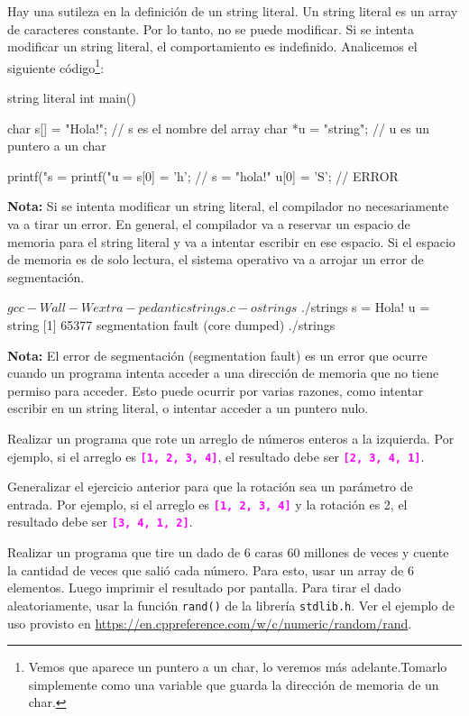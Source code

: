 \documentclass[]{scrartcl}
\newcommand{\hl}[1]{\textcolor{magenta}{\textbf{\texttt{#1}}}}
\begin{document}
Hay una sutileza en la definición de un string literal. Un string literal es un array de caracteres constante. Por lo tanto, no se puede modificar. Si se intenta modificar un string literal, el comportamiento es indefinido. Analicemos el siguiente código\footnote{Vemos que aparece un puntero a un char, lo veremos más adelante.Tomarlo simplemente como una variable que guarda la dirección de memoria de un char.}:

\begin{cbox}[]{string literal}
  int main(){
    char s[] = "Hola!"; // s es el nombre del array
    char *u = "string"; // u es un puntero a un char
    
    printf("s = %
    printf("u = %
    s[0] = 'h'; // s = "hola!"
    u[0] = 'S'; // ERROR
  }
\end{cbox}

\begin{notebox}
  \textbf{Nota:} Si se intenta modificar un string literal, el compilador no necesariamente va a tirar un error. En general, el compilador va a reservar un espacio de memoria para el string literal y va a intentar escribir en ese espacio. Si el espacio de memoria es de solo lectura, el sistema operativo va a arrojar un error de segmentación.
\end{notebox}

\begin{bashbox}
$ gcc -Wall -Wextra -pedantic strings.c -o strings
$ ./strings
s = Hola!
u = string
[1] 65377 segmentation fault (core dumped) ./strings  
\end{bashbox}

\begin{notebox}
  \textbf{Nota:} El error de segmentación (segmentation fault) es un error que ocurre cuando un programa intenta acceder a una dirección de memoria que no tiene permiso para acceder. Esto puede ocurrir por varias razones, como intentar escribir en un string literal, o intentar acceder a un puntero nulo.
\end{notebox}


\begin{exbox}
  Realizar un programa que rote un arreglo de números enteros a la izquierda. Por ejemplo, si el arreglo es \hl{[1, 2, 3, 4]}, el resultado debe ser \hl{[2, 3, 4, 1]}. 
\end{exbox}
\begin{exbox}
  Generalizar el ejercicio anterior para que la rotación sea un parámetro de entrada. Por ejemplo, si el arreglo es \hl{[1, 2, 3, 4]} y la rotación es 2, el resultado debe ser \hl{[3, 4, 1, 2]}.
\end{exbox}
\begin{exbox}
  Realizar un programa que tire un dado de 6 caras 60 millones de veces y cuente la cantidad de veces que salió cada número. Para esto, usar un array de 6 elementos. Luego imprimir el resultado por pantalla.
  Para tirar el dado aleatoriamente, usar la función \texttt{rand()} de la librería \texttt{stdlib.h}. Ver el ejemplo de uso provisto en \url{https://en.cppreference.com/w/c/numeric/random/rand}.
\end{exbox}
\end{document}
